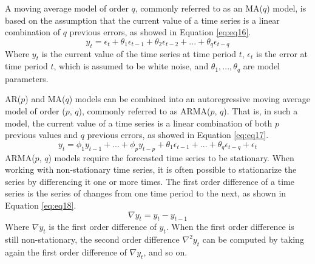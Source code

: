 \documentclass[12pt,oneside]{reedthesis}
\begin{document}
A moving average model of order \(q\), commonly referred to as an
MA(\(q\)) model, is based on the assumption that the current value of a
time series is a linear combination of \(q\) previous errors, as showed
in Equation \eqref{eq:eq16}.
\begin{equation}
y_{t} = \epsilon_{t} + \theta_{1}\epsilon_{t-1} + \theta_{2}\epsilon_{t-2} + ... + \theta_{q}\epsilon_{t-q}
\label{eq:eq16}
\end{equation}
Where \(y_{t}\) is the current value of the time series at time period
\(t\), \(\epsilon_{t}\) is the error at time period \(t\), which is
assumed to be white noise, and \(\theta_{1},...,\theta_{q}\) are model
parameters.

AR(\(p\)) and MA(\(q\)) models can be combined into an autoregressive
moving average model of order (\(p\), \(q\)), commonly referred to as
ARMA(\(p\), \(q\)). That is, in such a model, the current value of a
time series is a linear combination of both \(p\) previous values and
\(q\) previous errors, as showed in Equation \eqref{eq:eq17}.
\begin{equation}
y_{t} = \phi_{1}y_{t-1} + ... + \phi_{p}y_{t-p} + \theta_{1}\epsilon_{t-1} + ... + \theta_{q}\epsilon_{t-q} + \epsilon_{t} 
\label{eq:eq17}
\end{equation}
ARMA(\(p\), \(q\)) models require the forecasted time series to be
stationary. When working with non-stationary time series, it is often
possible to stationarize the series by differencing it one or more
times. The first order difference of a time series is the series of
changes from one time period to the next, as shown in Equation
\eqref{eq:eq18}.
\begin{equation}
\nabla y_{t} = y_{t} - y_{t-1}
\label{eq:eq18}
\end{equation}
Where \(\nabla y_{t}\) is the first order difference of \(y_{t}\). When
the first order difference is still non-stationary, the second order
difference \(\nabla^{2}y_{t}\) can be computed by taking again the first
order difference of \(\nabla y_{t}\), and so on.
\end{document}

